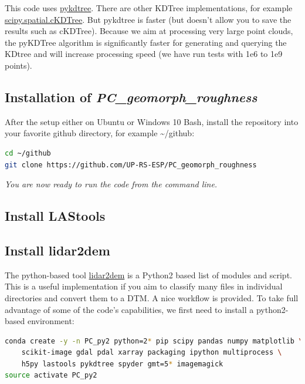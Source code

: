 \documentclass[a4paperpaper,,tablecaptionabove]{scrartcl}
\begin{document}
This code uses \href{https://github.com/storpipfugl/pykdtree}{pykdtree}.
There are other KDTree implementations, for example
\href{https://docs.scipy.org/doc/scipy-0.19.1/reference/generated/scipy.spatial.cKDTree.html}{scipy.spatial.cKDTree}.
But pykdtree is faster (but doesn't allow you to save the results such
as cKDTree). Because we aim at processing very large point clouds, the
pyKDTree algorithm is significantly faster for generating and querying
the KDtree and will increase processing speed (we have run tests with
1e6 to 1e9 points).

\hypertarget{installation-of-pc_geomorph_roughness}{%
\subsection{\texorpdfstring{Installation of
\emph{PC\_geomorph\_roughness}}{Installation of PC\_geomorph\_roughness}}\label{installation-of-pc_geomorph_roughness}}

After the setup either on Ubuntu or Windows 10 Bash, install the
repository into your favorite github directory, for example
\textasciitilde{}/github:

\begin{lstlisting}[language=bash]
cd ~/github
git clone https://github.com/UP-RS-ESP/PC_geomorph_roughness
\end{lstlisting}

\emph{You are now ready to run the code from the command line.}

\hypertarget{install-lastools}{%
\subsection{Install LAStools}\label{install-lastools}}

\hypertarget{install-lidar2dem}{%
\subsection{Install lidar2dem}\label{install-lidar2dem}}

The python-based tool
\href{http://applied-geosolutions.github.io/lidar2dems/}{lidar2dem} is a
Python2 based list of modules and script. This is a useful
implementation if you aim to classify many files in individual
directories and convert them to a DTM. A nice workflow is provided. To
take full advantage of some of the code's capabilities, we first need to
install a python2-based environment:

\begin{lstlisting}[language=bash]
conda create -y -n PC_py2 python=2* pip scipy pandas numpy matplotlib \
    scikit-image gdal pdal xarray packaging ipython multiprocess \
    h5py lastools pykdtree spyder gmt=5* imagemagick
source activate PC_py2
\end{lstlisting}
\end{document}
